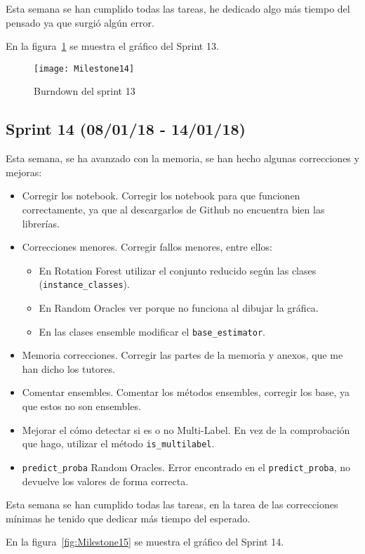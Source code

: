 Esta semana se han cumplido todas las tareas, he dedicado algo más tiempo del pensado ya que surgió algún error.

En la figura~\ref{fig:Milestone14} se muestra el gráfico del Sprint 13.

\begin{figure}
\centering
\texttt{[image: Milestone14]}
\caption{Burndown del sprint 13}
\label{fig:Milestone14}
\end{figure}

\subsection{Sprint 14 (08/01/18 - 14/01/18)}
Esta semana, se ha avanzado con la memoria, se han hecho algunas correcciones y mejoras:
\begin{itemize}
\item Corregir los notebook. Corregir los notebook para que funcionen correctamente, ya que al descargarlos de Github no encuentra bien las librerías.
\item Correcciones menores. Corregir fallos menores, entre ellos:
	\begin{itemize}
		\item En Rotation Forest utilizar el conjunto reducido según las clases (\texttt{instance\_classes}).
		\item En Random Oracles ver porque no funciona al dibujar la gráfica.
		\item En las clases ensemble modificar el \texttt{base\_estimator}.
	\end{itemize}
\item Memoria correcciones. Corregir las partes de la memoria y anexos, que me han dicho los tutores.
\item Comentar ensembles. Comentar los métodos ensembles, corregir los base, ya que estos no son ensembles.
\item Mejorar el cómo detectar si es o no Multi-Label. En vez de la comprobación que hago, utilizar el método \texttt{is\_multilabel}.
\item \texttt{predict\_proba} Random Oracles. Error encontrado en el \texttt{predict\_proba}, no devuelve los valores de forma correcta.
\end{itemize}

Esta semana se han cumplido todas las tareas, en la tarea de las correcciones mínimas he tenido que dedicar más tiempo del esperado.

En la figura~\ref{fig:Milestone15} se muestra el gráfico del Sprint 14.

